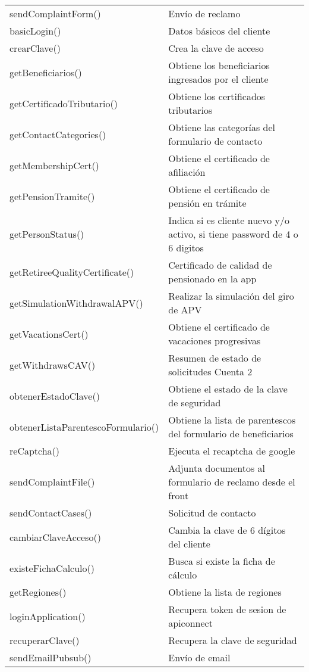\begin{longtable}{|p{7cm}|p{8.5cm}|}
    sendComplaintForm() &	Envío de reclamo \\
    basicLogin() &	Datos básicos del cliente \\
    crearClave() &	Crea la clave de acceso \\
    getBeneficiarios() &	Obtiene los beneficiarios ingresados por el cliente \\
    getCertificadoTributario() &	Obtiene los certificados tributarios \\
    getContactCategories() &	Obtiene las categorías del formulario de contacto \\
    getMembershipCert() &	Obtiene el certificado de afiliación \\
    getPensionTramite() &	Obtiene el certificado de pensión en trámite \\
    getPersonStatus() &	Indica si es cliente nuevo y/o activo, si tiene password de 4 o 6 digitos \\
    getRetireeQualityCertificate() &	Certificado de calidad de pensionado en la app \\
    getSimulationWithdrawalAPV() &	Realizar la simulación del giro de APV \\
    getVacationsCert() &	Obtiene el certificado de vacaciones progresivas \\
    getWithdrawsCAV() &	Resumen de estado de solicitudes Cuenta 2 \\
    obtenerEstadoClave() &	Obtiene el estado de la clave de seguridad \\
    obtenerListaParentescoFormulario() &	Obtiene la lista de parentescos del formulario de beneficiarios \\
    reCaptcha() &	Ejecuta el recaptcha de google \\
    sendComplaintFile() &	Adjunta documentos al formulario de reclamo desde el front \\
    sendContactCases() &	Solicitud de contacto \\
    cambiarClaveAcceso() &	Cambia la clave de 6 dígitos del cliente \\
    existeFichaCalculo() &	Busca si existe la ficha de cálculo \\
    getRegiones() &	Obtiene la lista de regiones \\
    loginApplication() &	Recupera token de sesion de apiconnect \\
    recuperarClave() &	Recupera la clave de seguridad \\
    sendEmailPubsub() &	Envío de email \\    
    \hline
\end{longtable}


